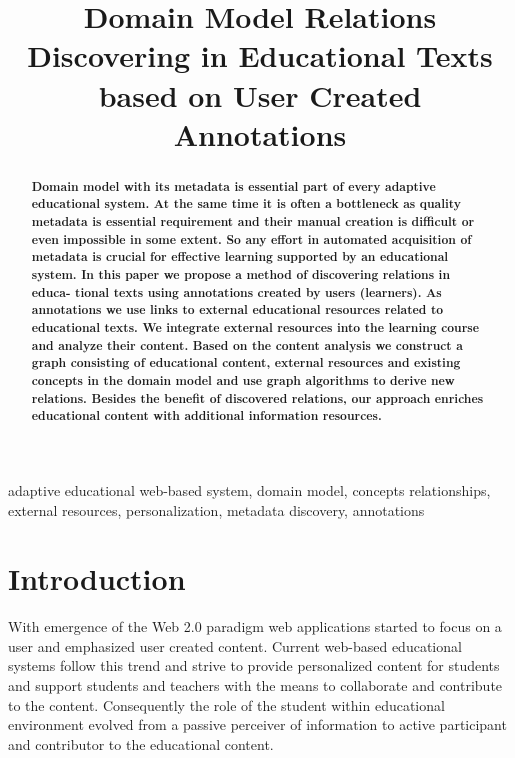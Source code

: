 \documentclass[a4, conference]{IEEEtran}
\begin{document}

\title{Domain Model Relations Discovering in Educational Texts based on User Created Annotations}%

\author{%
}
\maketitle

\begin{abstract}%
\textbf{ Domain model with its metadata is essential part of every adaptive educational system. At the same time it is often a bottleneck as quality metadata is essential requirement and their manual creation is difficult or even impossible in some extent. So any effort in automated acquisition of metadata is crucial for effective learning supported by an educational system. In this paper we propose a method of discovering relations in educa- tional texts using annotations created by users (learners). As annotations we use links to external educational resources related to educational texts. We integrate external resources into the learning course and analyze their content. Based on the content analysis we construct a graph consisting of educational content, external resources and existing concepts in the domain model and use graph algorithms to derive new relations. Besides the benefit of discovered relations, our approach enriches educational content with additional information resources.}
\end{abstract}
\begin{IEEEkeywords}%
adaptive educational web-based system, domain model, concepts relationships, external resources, personalization, metadata discovery, annotations
\end{IEEEkeywords}
\IEEEpeerreviewmaketitle
\section{Introduction}%
With emergence of the Web 2.0 paradigm web applications started to focus on a user and emphasized user created content. Current web-based educational systems follow this trend and strive to provide personalized content for students and support students and teachers with the means to collaborate and contribute to the content. Consequently the role of the student within educational environment evolved from a passive perceiver of information to active participant and contributor to the educational content.
\end{document}
